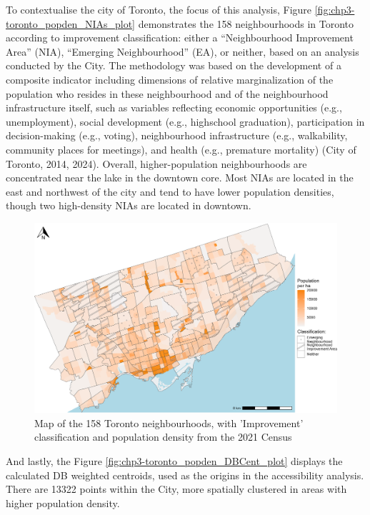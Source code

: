\documentclass[
11pt, %
oneside, %
english, %
singlespacing, %
]{macthesis} %
\begin{document}
To contextualise the city of Toronto, the focus of this analysis, Figure \ref{fig:chp3-toronto_popden_NIAs_plot} demonstrates the 158 neighbourhoods in Toronto according to improvement classification: either a ``Neighbourhood Improvement Area'' (NIA), ``Emerging Neighbourhood'' (EA), or neither, based on an analysis conducted by the City. The methodology was based on the development of a composite indicator including dimensions of relative marginalization of the population who resides in these neighbourhood and of the neighbourhood infrastructure itself, such as variables reflecting economic opportunities (e.g., unemployment), social development (e.g., highschool graduation), participation in decision-making (e.g., voting), neighbourhood infrastructure (e.g., walkability, community places for meetings), and health (e.g., premature mortality) (City of Toronto, 2014, 2024). Overall, higher-population neighbourhoods are concentrated near the lake in the downtown core. Most NIAs are located in the east and northwest of the city and tend to have lower population densities, though two high-density NIAs are located in downtown.

\begin{figure}

{\centering \includegraphics[width=6in]{./data/figures/chp3-toronto_popden_NIAs_plot} 

}

\caption{\label{fig:chp3-toronto_popden_NIAs_plot}Map of the 158 Toronto neighbourhoods, with 'Improvement' classification and population density from the 2021 Census}\label{fig:unnamed-chunk-43}
\end{figure}

And lastly, the Figure \ref{fig:chp3-toronto_popden_DBCent_plot} displays the calculated DB weighted centroids, used as the origins in the accessibility analysis. There are 13322 points within the City, more spatially clustered in areas with higher population density.
\end{document}
